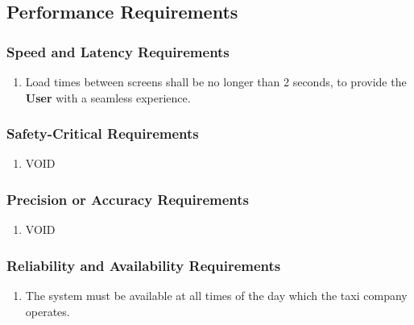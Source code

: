 \documentclass[english]{article}
\begin{document}

\subsection{Performance Requirements}
\label{sub:performance_requirements}

\subsubsection{Speed and Latency Requirements}
\label{ssub:speed_and_latency_requirements}
\begin{enumerate}[{SLR}1. ]
	\item Load times between screens shall be no longer than 2 seconds, to provide the \textbf{User} with a seamless experience.
\end{enumerate}

\subsubsection{Safety-Critical Requirements}
\label{ssub:safety_critical_requirements}
\begin{enumerate}[{SCR}1. ]
	\item VOID
\end{enumerate}

\subsubsection{Precision or Accuracy Requirements}
\label{ssub:precision_or_accuracy_requirements}
\begin{enumerate}[{PAR}1. ]
	\item VOID
\end{enumerate}

\subsubsection{Reliability and Availability Requirements}
\label{ssub:reliability_and_availability_requirements}
\begin{enumerate}[{RAR}1. ]
	\item The system must be available at all times of the day which the taxi company operates.
\end{enumerate}
\end{document}
